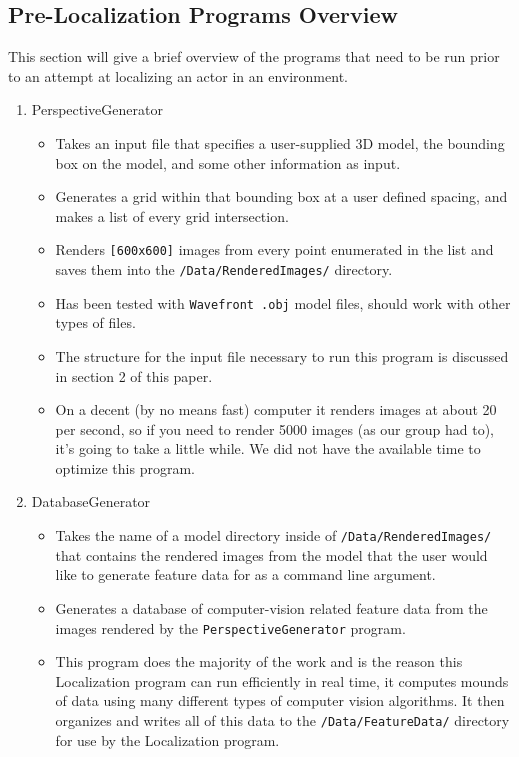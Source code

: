 \documentclass[a4paper,11pt]{article}
\begin{document}
        \subsection{Pre-Localization Programs Overview}
	This section will give a brief overview of the programs that need to be run prior to an attempt at localizing an actor in an environment.
        \begin{enumerate}
        \item PerspectiveGenerator
            \begin{itemize}
            \item Takes an input file that specifies a user-supplied 3D model, the bounding box on the model, and some other information as input. 
            \item Generates a grid within that bounding box at a user defined spacing, and makes a list of every grid intersection.
            \item Renders \texttt{[600x600]} images from every point enumerated in the list and saves them into the \texttt{/Data/RenderedImages/} directory.
            \item Has been tested with \texttt{Wavefront .obj} model files, should work with other types of files.
            \item The structure for the input file necessary to run this program is discussed in section 2 of this paper.
            \item On a decent (by no means fast) computer it renders images at about 20 per second, so if you need to render 5000 images (as our group had to), it's going to take a little while. We did not have the available time to optimize this program.
            \end{itemize}
        \item DatabaseGenerator
            \begin{itemize}
            \item Takes the name of a model directory inside of \texttt{/Data/RenderedImages/} that contains the rendered images from the model that the user would like to generate feature data for as a command line argument.
            \item Generates a database of computer-vision related feature data from the images rendered by the \texttt{PerspectiveGenerator} program.
            \item This program does the majority of the work and is the reason this Localization program can run efficiently in real time, it computes mounds of data using many different types of computer vision algorithms. It then organizes and writes all of this data to the \texttt{/Data/FeatureData/} directory for use by the Localization program.
            \end{itemize}
        \end{enumerate}
  
\end{document}
